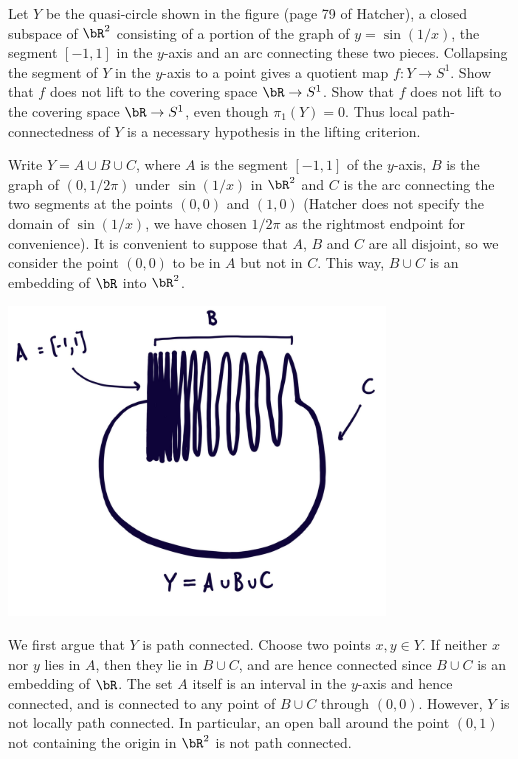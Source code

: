 \begin{homework}[e]
   Let $Y$ be the quasi-circle shown in the figure (page 79 of Hatcher), a closed subspace of $\bR^2$ consisting of a portion of the graph of $y = \sin \left(1/x\right)$, the segment $[-1,1]$ in the $y$-axis and an arc connecting these two pieces. Collapsing the segment of $Y$ in the $y$-axis to a point gives a quotient map $f:Y\to S^1$. Show that $f$ does not lift to the covering space $\bR \to S^1$. Show that $f$ does not lift to the covering space $\bR \to S^1$, even though $\pi_1(Y) = 0$. Thus local path-connectedness of $Y$ is a necessary hypothesis in the lifting criterion.
  \begin{prf}
    Write $Y = A\cup B\cup C$, where $A$ is the segment $[-1,1]$ of the $y$-axis, $B$ is the graph of $(0,1/2\pi)$ under $\sin(1/x)$ in $\bR^2$ and $C$ is the arc connecting the two segments at the points $(0,0)$ and $(1,0)$ (Hatcher does not specify the domain of $\sin(1/x)$, we have chosen $1/2\pi$ as the rightmost endpoint for convenience). It is convenient to suppose that $A$, $B$ and $C$ are all disjoint, so we consider the point $(0,0)$ to be in $A$ but not in $C$. This way, $B\cup C$ is an embedding of $\bR$ into $\bR^2$.
    \begin{center}
      \includegraphics[width=10cm]{figures/hwk6-fig1.jpg}
      \label{fig:prob1-1}
    \end{center}

    We first argue that $Y$ is path connected. Choose two points $x,y \in Y$. If neither $x$ nor $y$ lies in $A$, then they lie in $B\cup C$, and are hence connected since $B\cup C$ is an embedding of $\bR$. The set $A$ itself is an interval in the $y$-axis and hence connected, and is connected to any point of $B\cup C$ through $(0,0)$. However, $Y$ is not locally path connected. In particular, an open ball around the point $(0,1)$ not containing the origin in $\bR^2$ is not path connected.


\end{prf}
\end{homework}
